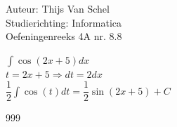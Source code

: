 \documentclass[a4paper]{article}
\newcommand{\dint}{\displaystyle\int}
\begin{document}
  
\noindent \large Auteur: Thijs Van Schel \\
\noindent \large Studierichting: Informatica\\
\noindent \large Oefeningenreeks 4A nr. 8.8\\

\medskip

\normalsize

$\dint\cos(2x+5) dx$\\

$t = 2x+5 \Rightarrow dt = 2dx$\\

$\dfrac{1}{2} \dint \cos (t) dt = \dfrac{1}{2}\sin(2x+5)+C$

\begin{thebibliography}{999}
\end{thebibliography}
\end{document}
